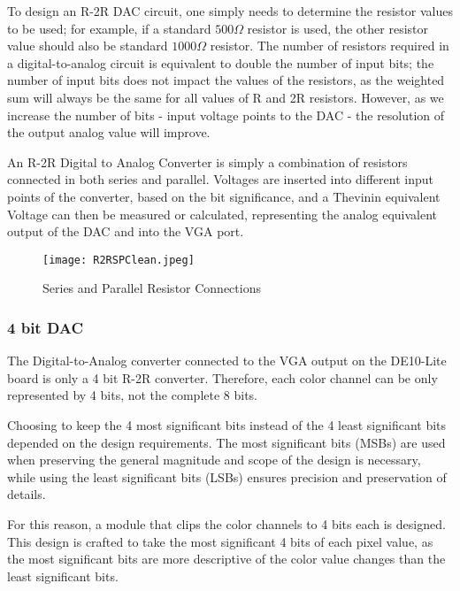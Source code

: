 \par To design an R-2R DAC circuit, one simply needs to determine the resistor values to be used; for example, if a standard \begin{math}500 \Omega\end{math} resistor is used, the other resistor value should also be standard \begin{math}1000 \Omega\end{math} resistor. The number of resistors required in a digital-to-analog circuit is equivalent to double the number of input bits; the number of input bits does not impact the values of the resistors, as the weighted sum will always be the same for all values of R and 2R resistors. However, as we increase the number of bits - input voltage points to the DAC - the resolution of the output analog value will improve.\newline
\par An R-2R Digital to Analog Converter is simply a combination of resistors connected in both series and parallel. Voltages are inserted into different input points of the converter, based on the bit significance, and a Thevinin equivalent Voltage can then be measured or calculated, representing the analog equivalent output of the DAC and into the VGA port.\newline

\begin{figure}[H]
    \centering
    \texttt{[image: R2RSPClean.jpeg]}
    \caption{Series and Parallel Resistor Connections}
    \label{fig:R2RSP}  
\end{figure}

\subsubsection{4 bit DAC}
\par The Digital-to-Analog converter connected to the VGA output on the DE10-Lite board is only a 4 bit R-2R converter. Therefore, each color channel can be only represented by 4 bits, not the complete 8 bits. \newline
\par Choosing to keep the 4 most significant bits instead of the 4 least significant bits depended on the design requirements. The most significant bits (MSBs) are used when preserving the general magnitude and scope of the design is necessary, while using the least significant bits (LSBs) ensures precision and preservation of details. \newline
\par For this reason, a module that clips the color channels to 4 bits each is designed. This design is crafted to take the most significant 4 bits of each pixel value, as the most significant bits are more descriptive of the color value changes than the least significant bits. \newline

